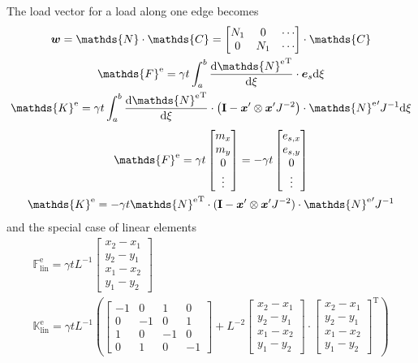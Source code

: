 \documentclass[a4paper,11pt]{article}
\renewcommand{\to}[1]{\text{\boldmath $#1$}} %
\newcommand{\ts}[1]{\text{\boldmath $\mathrm{#1}$}} %
\newcommand{\uv}[1]{\mathds{#1}}
\newcommand{\um}[1]{\mathds{#1}}
\newcommand{\intd}[1]{\mathrm{d}#1}
\newcommand{\dderiv}[2]{\frac{\mathrm{d}#1}{\mathrm{d}#2}}
\newcommand{\T}{\mathrm{T}}
\newcommand{\element}{\mathrm{e}}
\newcommand{\linear}{\mathrm{lin}}
\begin{document}
The load vector for a load along one edge becomes
\begin{gather}
 \to w = \um{N}\cdot\um{C} = \begin{bmatrix}N_1 & 0 & \cdots\\ 0 & N_1 & \cdots \end{bmatrix}\cdot \um{C}\\
 \uv F^\element = \gamma t \int_a^b \dderiv{{\um N^\element}^\T}{\xi}\cdot \to e_s \intd\xi\\
 \um K^\element = \gamma t \int_a^b \dderiv{{\um N^\element}^\T}{\xi}\cdot \left(\ts I-\to x'\otimes\to x' J^{-2}\right)\cdot{\um N^\element}' J^{-1} \intd\xi
\end{gather}
\begin{gather}
 \uv F^\element = \gamma t \begin{bmatrix}m_x\\m_y\\0\\\vdots\end{bmatrix} = - \gamma t \begin{bmatrix}e_{s,x}\\e_{s,y}\\0\\\vdots\end{bmatrix}\\
 \um K^\element = -\gamma t {\um N^\element}^\T \cdot (\ts I - \to x'\otimes \to x' J^{-2})\cdot {\um N^\element}' J^{-1}
\end{gather}
and the special case of linear elements
\begin{gather}
 \uv F^\element_\linear = \gamma t L^{-1} \begin{bmatrix}x_2-x_1\\y_2-y_1\\x_1-x_2\\y_1-y_2\end{bmatrix}\\
 \um K^\element_\linear = \gamma t L^{-1}\left(
	\begin{bmatrix}-1&0&1&0\\0&-1&0&1\\1&0&-1&0\\0&1&0&-1\end{bmatrix}+
	L^{-2}\begin{bmatrix}x_2-x_1\\y_2-y_1\\x_1-x_2\\y_1-y_2\end{bmatrix}\cdot\begin{bmatrix}x_2-x_1\\y_2-y_1\\x_1-x_2\\y_1-y_2\end{bmatrix}^\T
  \right)
\end{gather}
\end{document}
